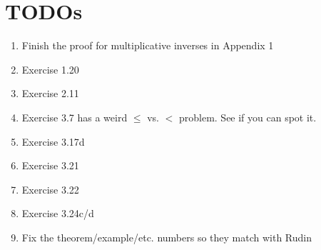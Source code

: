 \documentclass{scrbook}
\begin{document}
\chapter{TODOs}

\begin{enumerate}
\item Finish the proof for multiplicative inverses in Appendix 1
\item Exercise 1.20
\item Exercise 2.11
\item Exercise 3.7 has a weird $\le$ vs. $<$ problem. See if you can spot it.
\item Exercise 3.17d
\item Exercise 3.21
\item Exercise 3.22
\item Exercise 3.24c/d
\item Fix the theorem/example/etc. numbers so they match with Rudin
\end{enumerate}
\end{document}
